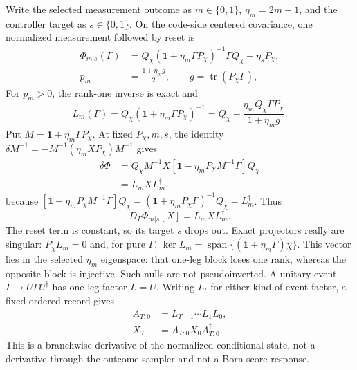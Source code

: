 \documentclass[aps,prx,twocolumn,superscriptaddress,longbibliography,nofootinbib,floatfix]{revtex4-2}
\newcommand{\Id}{\mathbf{1}}
\newcommand{\tr}{\operatorname{tr}}
\begin{document}
Write the selected measurement outcome as $m\in\{0,1\}$,
$\eta_m=2m-1$, and the controller target as $s\in\{0,1\}$.  On the code-side
centered covariance, one normalized measurement followed by reset is
\begin{align}
 \Phi_{m|s}(\Gamma)
 &=Q_\chi(\Id+\eta_m\Gamma P_\chi)^{-1}\Gamma Q_\chi
   +\eta_sP_\chi,\nonumber\\
 p_m&=\frac{1+\eta_m g}{2},\qquad g=\tr(P_\chi\Gamma),
 \label{eq:mobius}
\end{align}
For $p_m>0$, the rank-one inverse is exact and
\begin{equation}
 L_m(\Gamma)=Q_\chi(\Id+\eta_m\Gamma P_\chi)^{-1}
 =Q_\chi-\frac{\eta_m Q_\chi\Gamma P_\chi}{1+\eta_m g}.
 \label{eq:L}
\end{equation}
Put $M=\Id+\eta_m\Gamma P_\chi$.  At fixed $P_\chi,m,s$, the identity
$\delta M^{-1}=-M^{-1}(\eta_mXP_\chi)M^{-1}$ gives
\begin{align}
 \delta\Phi
 &=Q_\chi M^{-1}X
 [\Id-\eta_mP_\chi M^{-1}\Gamma]Q_\chi\nonumber\\
 &=L_mXL_m^\dagger ,
 \label{eq:derivative-step}
\end{align}
because $[\Id-\eta_mP_\chi M^{-1}\Gamma]Q_\chi
=(\Id+\eta_mP_\chi\Gamma)^{-1}Q_\chi=L_m^\dagger$.  Thus
\begin{equation}
 \boxed{D_\Gamma\Phi_{m|s}[X]=L_mXL_m^\dagger.}
 \label{eq:event-tangent}
\end{equation}
The reset term is constant, so its target $s$ drops out.  Exact projectors really are
singular: $P_\chi L_m=0$ and, for pure $\Gamma$,
$\ker L_m=\operatorname{span}\{(\Id+\eta_m\Gamma)\chi\}$.  This vector lies in
the selected $\eta_m$ eigenspace: that one-leg block loses one rank, whereas the opposite
block is injective.  Such nulls are not pseudoinverted.  A unitary event
$\Gamma\mapsto U\Gamma U^\dagger$ has one-leg factor $L=U$.  Writing $L_t$ for either
kind of event factor, a fixed ordered record gives
\begin{align}
 A_{T:0}&=L_{T-1}\cdots L_1L_0,\nonumber\\
 X_T&=A_{T:0}X_0A_{T:0}^\dagger .
 \label{eq:cocycle}
\end{align}
This is a branchwise derivative of the normalized conditional state, not a derivative
through the outcome sampler and not a Born-score response.
\end{document}
